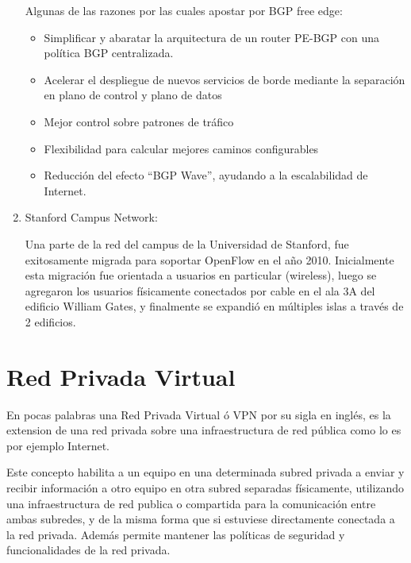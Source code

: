 \begin{enumerate}
Algunas de las razones por las cuales apostar por BGP free edge:
\begin{itemize}
\item Simplificar y abaratar la arquitectura de un router PE-BGP con una política BGP centralizada.
\item Acelerar el despliegue de nuevos servicios de borde mediante la separación en plano de control y plano de datos
\item Mejor control sobre patrones de tráfico
\item Flexibilidad para calcular mejores caminos configurables
\item Reducción del efecto ``BGP Wave'', ayudando a la escalabilidad de Internet.
\end{itemize}

\item Stanford Campus Network:

Una parte de la red del campus de la Universidad de Stanford, fue exitosamente migrada para soportar OpenFlow en el año 2010.
Inicialmente esta migración fue orientada a usuarios en particular (wireless), luego se agregaron los usuarios físicamente conectados por cable en el ala 3A del edificio William Gates, y finalmente se expandió en múltiples islas a través de 2 edificios.

\end{enumerate}

\section{Red Privada Virtual}
\label{section2.7}

En pocas palabras una Red Privada Virtual \'o VPN por su sigla en ingl\'es, es la extension de una red privada sobre una infraestructura de red p\'ublica como lo es por ejemplo Internet.

Este concepto habilita a un equipo en una determinada subred privada a enviar y recibir información a otro equipo en otra subred separadas f\'isicamente, utilizando una infraestructura de red publica o compartida para la comunicaci\'on entre ambas subredes, y de la misma forma que si estuviese directamente conectada a la red privada. Adem\'as permite mantener las políticas de seguridad y funcionalidades de la red privada.\\


